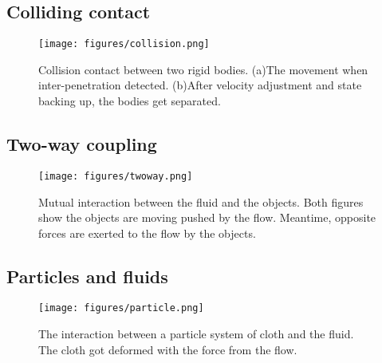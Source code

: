 \subsection{Colliding contact}
\begin{figure}[H]
\centering
  \texttt{[image: figures/collision.png]}
  \caption{Collision contact between two rigid bodies. (a)The movement when inter-penetration detected. (b)After velocity adjustment and state backing up, the bodies get separated.}
  \label{fig:collision}
\end{figure}

\subsection{Two-way coupling}
\begin{figure}[H]
\centering
  \texttt{[image: figures/twoway.png]}
  \caption{Mutual interaction between the fluid and the objects. Both figures show the objects are moving pushed by the flow. Meantime, opposite forces are exerted to the flow by the objects.}
  \label{fig:twoway}
\end{figure}

\subsection{Particles and fluids}
\begin{figure}[H]
\centering
  \texttt{[image: figures/particle.png]}
  \caption{The interaction between a particle system of cloth and the fluid. The cloth got deformed with the force from the flow. }
  \label{fig:particles}
\end{figure}








%


%
%
%



